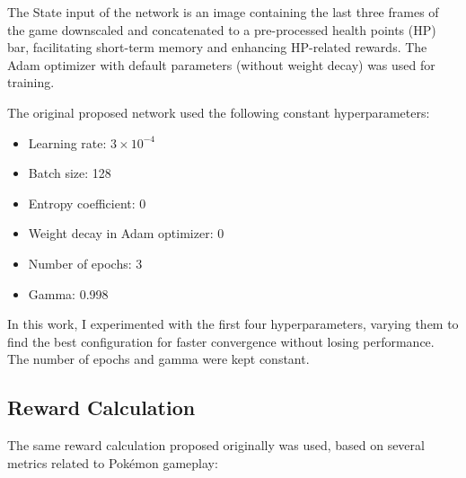 \documentclass[10pt,conference]{IEEEtran}
\begin{document}
The State input of the network is an image containing the last three frames of the game downscaled and concatenated to a pre-processed health points (HP) bar, facilitating short-term memory and enhancing HP-related rewards. The Adam optimizer with default parameters (without weight decay) was used for training. 

The original proposed network used the following constant hyperparameters:

\begin{itemize}
  \item Learning rate: \(3 \times 10^{-4}\)
  \item Batch size: 128
  \item Entropy coefficient: 0
  \item Weight decay in Adam optimizer: 0
  \item Number of epochs: 3
  \item Gamma: 0.998
\end{itemize}

In this work, I experimented with the first four hyperparameters, varying them to find the best configuration for faster convergence without losing performance. The number of epochs and gamma were kept constant.





\subsection{Reward Calculation}

The same reward calculation proposed originally was used, based on several metrics related to Pokémon gameplay:
\end{document}
